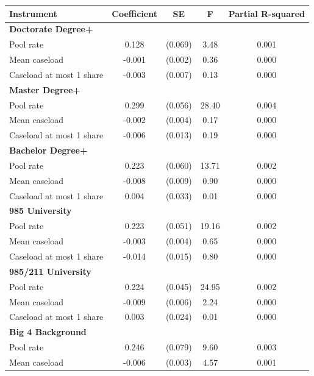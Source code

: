 \documentclass[10pt]{article}
\newcommand{\sym}[1]{\textsuperscript{#1}}
\begin{document}
\begin{minipage}{19cm}\fontsize{10}{12}\selectfont\setlength{\tabcolsep}{4pt}\renewcommand{\arraystretch}{1.12}


\def\sym#1{\ifmmode^{#1}\else\(^{#1}\)\fi}
\centering
{}
\begin{threeparttable}
\begin{tabular}{p{}cccc}
\toprule
Instrument & Coefficient & SE & F & Partial R-squared \\
\midrule
\multicolumn{5}{l}{\textbf{Doctorate Degree+}} \\
Pool rate & 0.128 & (0.069) & 3.48 & 0.001 \\
Mean caseload & -0.001 & (0.002) & 0.36 & 0.000 \\
Caseload at most 1 share & -0.003 & (0.007) & 0.13 & 0.000 \\
\multicolumn{5}{l}{\textbf{Master Degree+}} \\
Pool rate & 0.299 & (0.056) & 28.40 & 0.004 \\
Mean caseload & -0.002 & (0.004) & 0.17 & 0.000 \\
Caseload at most 1 share & -0.006 & (0.013) & 0.19 & 0.000 \\
\multicolumn{5}{l}{\textbf{Bachelor Degree+}} \\
Pool rate & 0.223 & (0.060) & 13.71 & 0.002 \\
Mean caseload & -0.008 & (0.009) & 0.90 & 0.000 \\
Caseload at most 1 share & 0.004 & (0.033) & 0.01 & 0.000 \\
\multicolumn{5}{l}{\textbf{985 University}} \\
Pool rate & 0.223 & (0.051) & 19.16 & 0.002 \\
Mean caseload & -0.003 & (0.004) & 0.65 & 0.000 \\
Caseload at most 1 share & -0.014 & (0.015) & 0.80 & 0.000 \\
\multicolumn{5}{l}{\textbf{985/211 University}} \\
Pool rate & 0.224 & (0.045) & 24.95 & 0.002 \\
Mean caseload & -0.009 & (0.006) & 2.24 & 0.000 \\
Caseload at most 1 share & 0.003 & (0.024) & 0.01 & 0.000 \\
\multicolumn{5}{l}{\textbf{Big 4 Background}} \\
Pool rate & 0.246 & (0.079) & 9.60 & 0.003 \\
Mean caseload & -0.006 & (0.003) & 4.57 & 0.001 \\

\end{tabular}
\end{threeparttable}
\end{minipage}
\end{document}
